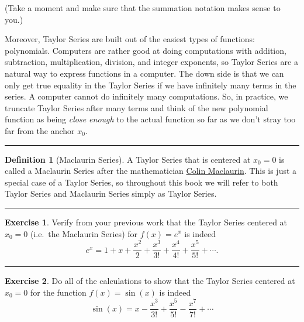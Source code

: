\documentclass[
]{book}
\theoremstyle{definition}
\newtheorem{definition}{Definition}[chapter]
\theoremstyle{definition}
\theoremstyle{definition}
\newtheorem{exercise}{Exercise}[chapter]
\theoremstyle{remark}
\begin{document}
(Take a moment and make sure that the summation notation makes sense to you.)

Moreover, Taylor Series are built out of the easiest types of functions: polynomials. Computers are rather good at doing computations with addition, subtraction, multiplication, division, and integer exponents, so Taylor Series are a natural way to express functions in a computer. The down side is that we can only get true equality in the Taylor Series if we have infinitely many terms in the series. A computer cannot do infinitely many computations. So, in practice, we truncate Taylor Series after many terms and think of the new polynomial function as being \emph{close enough} to the actual function so far as we don't stray too far from the anchor \(x_0\).

\begin{center}\rule{0.5\linewidth}{0.5pt}\end{center}

\begin{definition}[Maclaurin Series]
\protect\hypertarget{def:unnamed-chunk-38}{}{\label{def:unnamed-chunk-38} {} }A Taylor Series that is centered at \(x_0 = 0\) is called a Maclaurin Series after the mathematician \href{https://en.wikipedia.org/wiki/Colin_Maclaurin}{Colin Maclaurin}. This is just a special case of a Taylor Series, so throughout this book we will refer to both Taylor Series and Maclaurin Series simply as Taylor Series.
\end{definition}

\begin{center}\rule{0.5\linewidth}{0.5pt}\end{center}

\begin{exercise}
\protect\hypertarget{exr:unnamed-chunk-39}{}{\label{exr:unnamed-chunk-39} }Verify from your previous work that the Taylor Series centered at \(x_0 = 0\) (i.e.~the Maclaurin Series) for \(f(x) = e^x\) is indeed
\[ e^x = 1 + x + \frac{x^2}{2} + \frac{x^3}{3!} + \frac{x^4}{4!} + \frac{x^5}{5!} + \cdots. \]
\end{exercise}

\begin{center}\rule{0.5\linewidth}{0.5pt}\end{center}

\begin{exercise}
\protect\hypertarget{exr:unnamed-chunk-40}{}{\label{exr:unnamed-chunk-40} }Do all of the calculations to show that the Taylor Series centered at \(x_0 = 0\) for the function \(f(x) = \sin(x)\) is indeed
\[ \sin(x) = x - \frac{x^3}{3!} + \frac{x^5}{5!} - \frac{x^7}{7!} + \cdots \]
\end{exercise}
\end{document}
